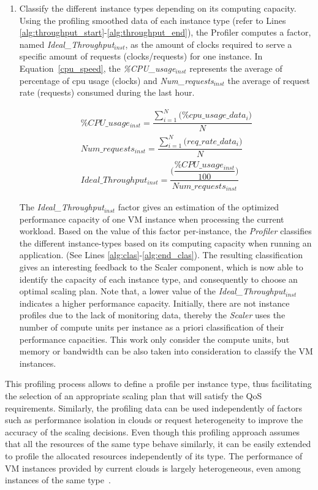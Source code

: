 \begin{enumerate}
\item Classify the different instance types depending on its computing capacity. Using the profiling smoothed data of each instance type (refer to Lines \ref{alg:throughput_start}-\ref{alg:throughput_end}), the Profiler computes a factor, named \emph{Ideal\_Throughput$_{inst}$}, as the amount of clocks required to serve a specific amount of requests (clocks/requests)  for one instance. In Equation~\ref{cpu_speed}, the \emph{\%CPU\_usage$_{inst}$} represents the average of percentage of cpu usage (clocks) and \emph{Num\_requests$_{inst}$} the average of request rate (requests) consumed during the last hour.



{\scriptsize
\begin{equation}\label{cpu_speed}
\begin{split}
\% CPU\_usage_{inst} = \dfrac{   \sum_{i=1}^N \big( \% cpu\_usage\_data_{i}  \big) } { N } \\
Num\_requests_{inst} = \dfrac{   \sum_{i=1}^N \big( req\_rate\_data_{i} \big) } { N } \\
Ideal\_Throughput_{inst} =\dfrac{ \bigg( \dfrac{\% CPU\_usage_{inst} } { 100 }  \bigg) } {  Num\_requests_{inst}   } 
\end{split}
\end{equation}
}

The \emph{Ideal\_Throughput$_{inst}$} factor gives an estimation of the optimized performance capacity of one VM instance when processing the current workload. Based on the value of this factor per-instance, the \emph{Profiler} classifies the different instance-types based on its computing capacity when running an application. (See Lines \ref{alg:clas}-\ref{alg:end_clas}). The resulting classification gives an interesting feedback to the Scaler component, which is now able to identify the capacity of each instance type, and consequently to choose an optimal scaling plan. Note that, a lower value of the \emph{Ideal\_Throughput$_{inst}$} indicates a higher performance capacity. Initially, there are not instance profiles due to the lack of monitoring data, thereby the \emph{Scaler} uses the number of compute units per instance as a priori classification of their performance capacities. This work only consider the compute units, but memory or bandwidth can be also taken into consideration to classify the VM instances.
\end{enumerate}

This profiling process allows to define a profile per instance type, thus facilitating the selection of an appropriate scaling plan that will satisfy the QoS requirements. Similarly, the profiling data can be used independently of factors such as performance isolation in clouds or request heterogeneity to improve the accuracy of the scaling decisions. Even though this profiling approach assumes that all the resources of the same type behave similarly, it can be easily extended to profile the allocated resources independently of its type. The performance of VM instances provided by current clouds is largely heterogeneous, even among instances of the same type~\cite{ec2Performance}.



